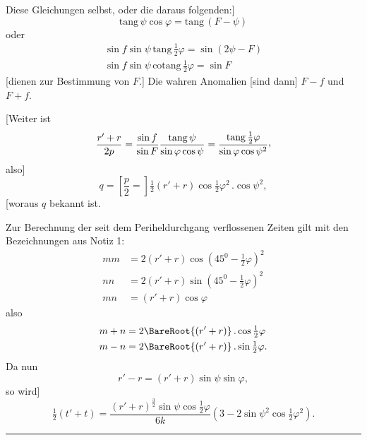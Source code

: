 Diese Gleichungen selbst, oder die daraus folgenden:]
\[
\mathrm{tang}\,\psi\cos\varphi=\mathrm{tang}\,(F-\psi)
\]
oder
\[
\begin{gathered}
\sin f\sin\psi\,\mathrm{tang}\,\tfrac12\varphi=\sin(2\psi-F)\\
\sin f\sin\psi\,\mathrm{cotang}\,\tfrac12\varphi=\sin F
\end{gathered}
\]
[dienen zur Bestimmung von \(F\).] Die wahren Anomalien [sind dann] \(F-f\) und \(F+f\).

[Weiter ist
\[
\frac{r'+r}{2p}=\frac{\sin f}{\sin F}\frac{\mathrm{tang}\,\psi}{\sin\varphi\cos\psi}=\frac{\mathrm{tang}\,\tfrac12\varphi}{\sin\varphi\cos\psi^2}\mathpunct{\raisebox{.45ex}{,}}
\]
also]
\[
q=\left[\frac p2=\right]\tfrac12(r'+r)\cos\tfrac12\varphi^2\,.\cos\psi^2,
\]
[woraus \(q\) bekannt ist.

Zur Berechnung der seit dem Periheldurchgang verflossenen Zeiten gilt mit den Bezeichnungen aus Notiz 1:
\[
\begin{aligned}
mm&=2(r'+r)\cos(45^0-\tfrac12\varphi)^2\\
nn&=2(r'+r)\sin(45^0-\tfrac12\varphi)^2\\
mn&=(r'+r)\cos\varphi
\end{aligned}
\]
also
\[
\begin{aligned}
m+n&=2\BareRoot{(r'+r)}\,.\cos\tfrac12\varphi\\
m-n&=2\BareRoot{(r'+r)}\,.\sin\tfrac12\varphi.
\end{aligned}
\]
Da nun
\[
r'-r=(r'+r)\sin\psi\sin\varphi,
\]
so wird]
\[
\tfrac12(t'+t)=\frac{(r'+r)^{\frac32}\sin\psi\cos\tfrac12\varphi}{6k}(3-2\sin\psi^2\cos\tfrac12\varphi^2).
\]
\begin{center}\rule{.3\linewidth}{.4pt}\end{center}

